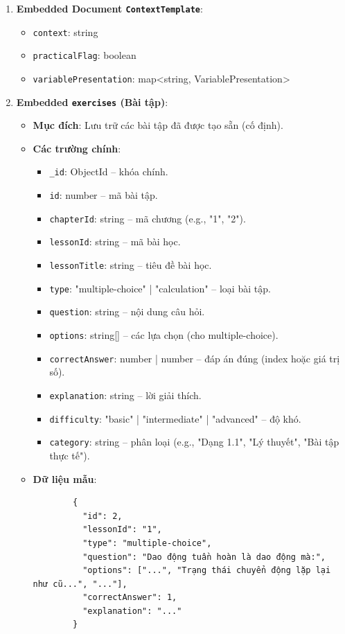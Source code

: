 \begin{enumerate}
    
    \item \textbf{Embedded Document \texttt{ContextTemplate}}:
    \begin{itemize}
        \item \texttt{context}: string
        \item \texttt{practicalFlag}: boolean
        \item \texttt{variablePresentation}: map<string, VariablePresentation>
    \end{itemize}
    
    \item \textbf{Embedded \texttt{exercises} (Bài tập)}:
    \begin{itemize}
        \item \textbf{Mục đích}: Lưu trữ các bài tập đã được tạo sẵn (cố định).
        \item \textbf{Các trường chính}:
        \begin{itemize}
            \item \texttt{\_id}: ObjectId – khóa chính.
            \item \texttt{id}: number – mã bài tập.
            \item \texttt{chapterId}: string – mã chương (e.g., "1", "2").
            \item \texttt{lessonId}: string – mã bài học.
            \item \texttt{lessonTitle}: string – tiêu đề bài học.
            \item \texttt{type}: "multiple-choice" | "calculation" – loại bài tập.
            \item \texttt{question}: string – nội dung câu hỏi.
            \item \texttt{options}: string[] – các lựa chọn (cho multiple-choice).
            \item \texttt{correctAnswer}: number | number – đáp án đúng (index hoặc giá trị số).
            \item \texttt{explanation}: string – lời giải thích.
            \item \texttt{difficulty}: "basic" | "intermediate" | "advanced" – độ khó.
            \item \texttt{category}: string – phân loại (e.g., "Dạng 1.1", "Lý thuyết", "Bài tập thực tế").
        \end{itemize}
        \item \textbf{Dữ liệu mẫu}:
        \begin{verbatim}
        {
          "id": 2,
          "lessonId": "1",
          "type": "multiple-choice",
          "question": "Dao động tuần hoàn là dao động mà:",
          "options": ["...", "Trạng thái chuyển động lặp lại như cũ...", "..."],
          "correctAnswer": 1,
          "explanation": "..."
        }
        \end{verbatim}
    \end{itemize}


\end{enumerate}
